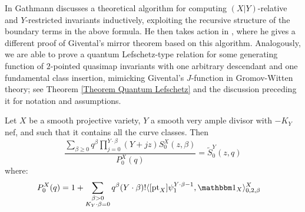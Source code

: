In \cite{Ga} Gathmann discusses a theoretical algorithm for computing $(X|Y)$-relative and $Y$-restricted invariants inductively, exploiting the recursive structure of the boundary terms in the above formula. He then takes action in \cite{Ga-MF}, where he gives a different proof of Givental's mirror theorem based on this algorithm. Analogously, we are able to prove a quantum Lefschetz-type relation for some generating function of $2$-pointed quasimap invariants with one arbitrary descendant and one fundamental class insertion, mimicking Givental's $J$-function in Gromov-Witten theory; see Theorem \ref{Theorem Quantum Lefschetz} and the discussion preceding it for notation and assumptions.
\begin{thm*}
Let $X$ be a smooth projective variety, $Y$ a smooth very ample divisor with $-K_Y$ nef, and such that it contains all the curve classes. Then
\begin{equation}\label{eqn:mirror}
\dfrac{\sum_{\beta\geq 0} q^\beta\prod_{j=0}^{Y\cdot\beta}(Y+jz)S_0^X(z,\beta)}{P_0^X(q)}= \tilde{S}_0^Y(z,q)
\end{equation}
where:
\begin{align*}
 P_0^X(q) %
            & = 1 + \sum_{\substack{\beta>0 \\ K_Y\cdot\beta=0}} q^\beta(Y\cdot\beta)!\langle [\pt_X] \psi_1^{Y\cdot\beta-1} ,\mathbbm 1_{X}\rangle_{0,2,\beta}^X
\end{align*}
\end{thm*}

\smallskip

